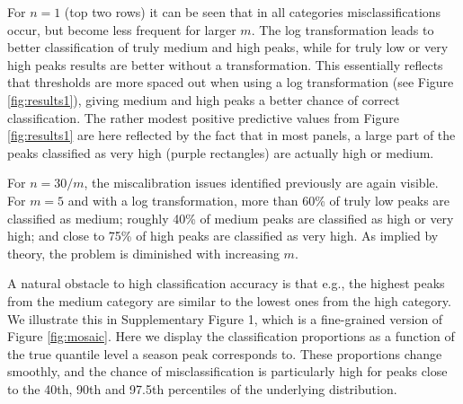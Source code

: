 \documentclass[12pt]{article}
\begin{document}
For $n = 1$ (top two rows) it can be seen that in all categories misclassifications occur, but become less frequent for larger $m$. The log transformation leads to better classification of truly medium and high peaks, while for truly low or very high peaks results are better without a transformation. This essentially reflects that thresholds are more spaced out when using a log transformation (see Figure \ref{fig:results1}), giving medium and high peaks a better chance of correct classification. The rather modest positive predictive values from Figure \ref{fig:results1} are here reflected by the fact that in most panels, a large part of the peaks classified as very high (purple rectangles) are actually high or medium.

For $n = 30/m$, the miscalibration issues identified previously are again visible. For $m = 5$ and with a log transformation, more than 60\% of truly low peaks are classified as medium; roughly 40\% of medium peaks are classified as high or very high; and close to 75\% of high peaks are classified as very high. As implied by theory, the problem is diminished with increasing $m$.

A natural obstacle to high classification accuracy is that e.g., the highest peaks from the medium category are similar to the lowest ones from the high category. We illustrate this in Supplementary Figure 1, which is a fine-grained version of Figure \ref{fig:mosaic}. Here we display the classification proportions as a function of the true quantile level a season peak corresponds to. These proportions change smoothly, and the chance of misclassification is particularly high for peaks close to the 40th, 90th and 97.5th percentiles of the underlying distribution.
\end{document}
